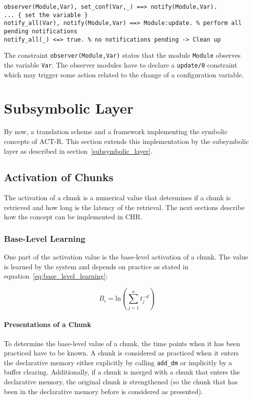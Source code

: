 \begin{lstlisting}
observer(Module,Var), set_conf(Var,_) ==> notify(Module,Var).
... { set the variable }
notify_all(Var), notify(Module,Var) ==> Module:update. % perform all pending notifications
notify_all(_) <=> true. % no notifications pending -> Clean up
\end{lstlisting}

The constraint \lstinline|observer(Module,Var)| states that the module \lstinline|Module| observes the variable \lstinline|Var|. The observer modules have to declare a \lstinline|update/0| constraint which may trigger some action related to the change of a configuration variable.

\section{Subsymbolic Layer}

By now, a translation scheme and a framework implementing the symbolic concepts of ACT-R. This section extends this implementation by the subsymbolic layer as described in section~\ref{subsymbolic_layer}.

\subsection{Activation of Chunks}

The activation of a chunk is a numerical value that determines if a chunk is retrieved and how long is the latency of the retrieval. The next sections describe how the concept can be implemented in CHR.

\subsubsection{Base-Level Learning}

One part of the activation value is the base-level activation of a chunk. The value is learned by the system and depends on practice as stated in equation~\eqref{eq:base_level_learning}:

\begin{equation*}
B_i = \mathrm{ln}\left(\sum_{j=1}^n{t_j^{-d}}\right) 
\end{equation*}

\paragraph{Presentations of a Chunk} 

To determine the base-level value of a chunk, the time points when it has been practiced have to be known. A chunk is considered as practiced when it enters the declarative memory either explicitly by calling \lstinline|add_dm| or implicitly by a buffer clearing. Additionally, if a chunk is merged with a chunk that enters the declarative memory, the original chunk is strengthened (so the chunk that has been in the declarative memory before is considered as presented). 

